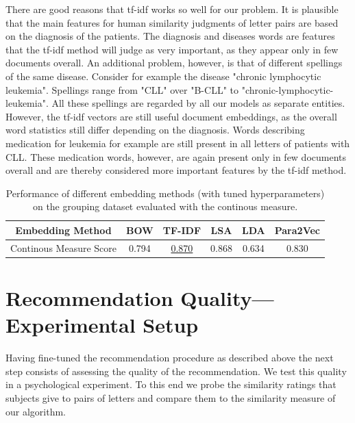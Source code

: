 There are good reasons that tf-idf works so well for our problem. It is plausible that the main features for human similarity judgments of letter pairs are based on the diagnosis of the patients. The diagnosis and diseases words are features that the tf-idf method will judge as very important, as they appear only in few documents overall. An additional problem, however, is that of different spellings of the same disease. Consider for example the disease "chronic lymphocytic leukemia". Spellings range from "CLL" over "B-CLL" to "chronic-lymphocytic-leukemia". All these spellings are regarded by all our models as separate entities. However, the tf-idf vectors are still useful document embeddings, as the overall word statistics still differ depending on the diagnosis. Words describing medication for leukemia for example are still present in all letters of patients with CLL. These medication words, however, are again present only in few documents overall and are thereby considered more important features by the tf-idf method.
\begin{table}
	\begin{tabular}{|c||c|c|c|c|c|}
		\hline 
		Embedding Method & BOW & TF-IDF & LSA & LDA  & Para2Vec\tabularnewline
		\hline 
		\hline 
		Continous Measure Score & 0.794 & \underline{0.870} & 0.868 & 0.634 & 0.830\tabularnewline
		\hline 
	\end{tabular}
	\caption{Performance of different embedding methods (with tuned hyperparameters) on the grouping dataset evaluated with the continous measure.}
	\label{table:continuous_measure}
\end{table}



\section{Recommendation Quality---Experimental Setup}
Having fine-tuned the recommendation procedure as described above the next step consists of assessing the quality of the recommendation. We test this quality in a psychological experiment. To this end we probe the similarity ratings that subjects give to pairs of letters and compare them to the similarity measure of our algorithm.

